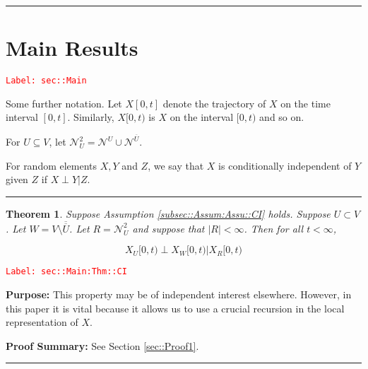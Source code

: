 \documentclass[12pt]{article}
\newcommand{\mc}{\mathcal}
\newcommand{\ov}{\overline}
\newcommand{\tr}{\textcolor{red}}
\newcommand{\labe}[1]{\tr{\texttt{Label: #1}}}
\newcommand{\purpose}{\textbf{Purpose: }}
\newcommand{\pfsum}{\textbf{Proof Summary: }}
\newcommand{\ind}{\hspace{24pt}}
\newcommand{\lin}{\rule{\linewidth}{0.4 pt}}
\renewcommand{\U}{U}							%
\newcommand{\UU}{W}								%
\newcommand{\UUU}{R}							%
\renewcommand{\t}{t}							%
\newcommand{\X}{X}								%
\newcommand{\neigh}{\mc{N}}						%
\newcommand{\dneigh}{\mc{N}^2}					%
\newcommand{\vind}[1]{^{#1}}					%
\newcommand{\cind}[1]{_{#1}}					%
\newcommand{\tip}[1]{#1}						%
\newcommand{\dnvind}[1]{_{#1}}					%
\newcommand{\XX}{Y}								%
\newcommand{\XXX}{Z}							%
\newtheorem{thms}{Theorem}[section]
\begin{document}
\lin
\section{Main Results}
\label{sec::Main}\labe{sec::Main}

Some further notation. Let \(\X\tip{[0,\t]}\) denote the trajectory of \(\X\) on the time interval \([0,\t]\). Similarly, \(\X\tip{[0,\t)}\) is \(\X\) on the interval \([0,\t)\) and so on.

\ind For \(\U \subseteq V\), let \(\dneigh\dnvind{\U} = \neigh\vind{\U} \cup \neigh\vind{\ov{\U}}\). 

\ind For random elements \(\X,\XX\) and \(\XXX\), we say that \(\X\) is conditionally independent of \(\XX\) given \(\XXX\) if \(\X\perp\XX|\XXX\).

\lin

\begin{thms}
Suppose Assumption \ref{subsec::Assum:Assu::CI} holds. Suppose \(\U \subset V\). Let \(\UU =V\setminus \ov{\ov{\U}}\). Let \(\UUU= \dneigh\dnvind{U}\) and suppose that \(|\UUU| < \infty\). Then for all \(\t < \infty\),

\[\X\cind{\U}\tip{[0,\t)}\perp \X\cind{\UU}\tip{[0,\t)}|\X\cind{\UUU}\tip{[0,\t)}\]
\label{sec::Main:Thm::CI}
\end{thms}
\labe{sec::Main:Thm::CI}

\purpose This property may be of independent interest elsewhere. However, in this paper it is vital because it allows us to use a crucial recursion in the local representation of \(\X\).

\pfsum See Section \ref{sec::Proof1}.

\lin
\end{document}
